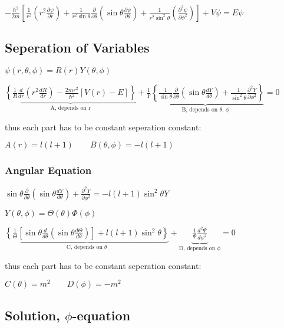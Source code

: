 \documentclass[10pt,a4paper]{scrartcl}
\begin{document}
\begin{multicols*}{3}
	$-\frac{\hbar^2}{2m}\left[\frac{1}{r^2}(r^2\frac{\partial\psi}{\partial r})+\frac{1}{r^2\sin\theta}\frac{\partial}{\partial\theta}(\sin\theta\frac{\partial\psi}{\partial\theta})+\frac{1}{r^2\sin^2\theta}(\frac{\partial^2\psi}{\partial\phi^2})\right]+V\psi=E\psi$
	
	\subsection{Seperation of Variables}
	
	$\psi(r,\theta,\phi)=R(r)Y(\theta,\phi)$
	
	\finn
	
	\tiny
	$\underbrace{\left\{\frac{1}{R}\frac{d}{dr}\left(r^2\frac{dR}{dr}\right)-\frac{2mr^2}{\hbar^2}[V(r)-E]\right\}}_{\text{A, depends on r}}+\underbrace{\frac{1}{Y}\left\{\frac{1}{\sin\theta}\frac{\partial}{\partial\theta}\left(\sin\theta\frac{dY}{d\theta}\right)+\frac{1}{\sin^2\theta}\frac{\partial^2Y}{\partial\phi^2}\right\}}_{\text{B, depends on $\theta$, $\phi$}}=0$	
	
	\normalsize
	
	\finn
	
	thus each part has to be constant \dahe seperation constant:
	
	$A(r)=l(l+1)\qquad B(\theta,\phi)=-l(l+1)$
	
	\subsubsection{Angular Equation}
	
	$\sin\theta\frac{\partial}{\partial\theta}\left(\sin\theta\frac{dY}{d\theta}\right)+\frac{\partial^2Y}{\partial\phi^2}=-l(l+1)\sin^2\theta Y$
	
	$Y(\theta,\phi)=\Theta(\theta)\Phi(\phi)$
	
	\finn	
	
	\footnotesize
	$\underbrace{\left\{\frac{1}{\Theta}\left[\sin\theta\frac{d}{d\theta}\left(\sin\theta\frac{d\Theta}{d\theta}\right)\right]+l(l+1)\sin^2\theta\right\}}_{\text{C, depends on $\theta$}}+\underbrace{\frac{1}{\Psi}\frac{d^2\Psi}{d\psi^2}}_{\text{D, depends on $\phi$}}=0$
	\normalsize
	
	\finn
	
	thus each part has to be constant \dahe seperation constant:
	
	$C(\theta)=m^2\qquad D(\phi)=-m^2$
	
	\subsection{Solution, $\phi$-equation}
	

\end{multicols*}
\end{document}
